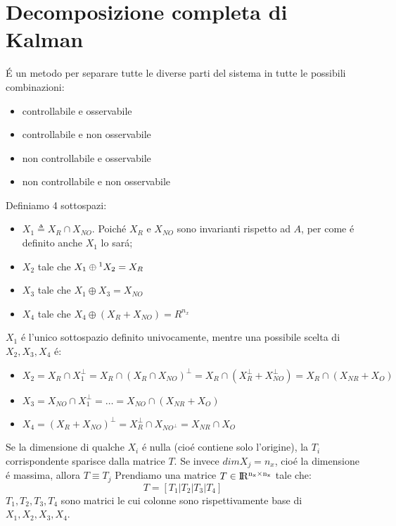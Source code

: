 \documentclass[../main.tex]{subfiles}
\begin{document}
	\section{Decomposizione completa di Kalman}
		\'E un metodo per separare tutte le diverse parti del sistema in tutte le possibili combinazioni:
		\begin{itemize}
			\item controllabile e osservabile
			\item controllabile e non osservabile
			\item non controllabile e osservabile
			\item non controllabile e non osservabile
		\end{itemize}
		\medskip
		Definiamo 4 sottospazi:
		\begin{itemize}
			\item $ X_1 \triangleq X_R \cap X_{NO} $. Poich\'e $ X_R $ e $ X_{NO} $ sono invarianti rispetto ad $ A $, per come \'e definito anche $ X_1 $ lo sar\'a;
			\item $ X_2 $ tale che $ X_1 \oplus\footnotemark X_2 = X_R $
			\item $ X_3 $ tale che $ X_1 \oplus X_3 = X_{NO} $
			\item $ X_4 $ tale che $ X_4 \oplus (X_R + X_{NO}) = R^{n_x} $
		\end{itemize}
		\medskip
		$ X_1 $ \'e l'unico sottospazio definito univocamente, mentre una possibile scelta di $ X_2, X_3, X_4 $ \'e:
		\begin{itemize}
			\item $ X_2 = X_R \cap X_1^{\perp} = X_R \cap (X_R \cap X_{NO})^{\perp} = X_R \cap (X_R^{\perp} + X_{NO}^{\perp}) = X_R \cap (X_{NR} + X_O) $
			\item $ X_3 = X_{NO} \cap X_1^{\perp} = \dots = X_{NO} \cap (X_{NR} + X_O) $
			\item $ X_4 = (X_R + X_{NO})^{\perp} = X_R^{\perp} \cap X_{NO^{\perp}} = X_{NR} \cap X_O $
		\end{itemize}
		Se la dimensione di qualche $ X_i $ \'e nulla (cio\'e contiene solo l'origine), la $ T_i $ corrispondente sparisce dalla matrice $ T $. Se invece $ dim X_j = n_x $, cio\'e la dimensione \'e massima, allora $ T \equiv T_j $
		\medskip
		Prendiamo una matrice $ T \in \rm I\!R^{n_x \times n_x} $ tale che:
		\[
			T = \left[ T_1 | T_2 | T_3 | T_4 \right]
		\]
		$ T_1, T_2, T_3, T_4 $ sono matrici le cui colonne sono rispettivamente base di $ X_1, X_2, X_3, X_4 $.
		
\end{document}
